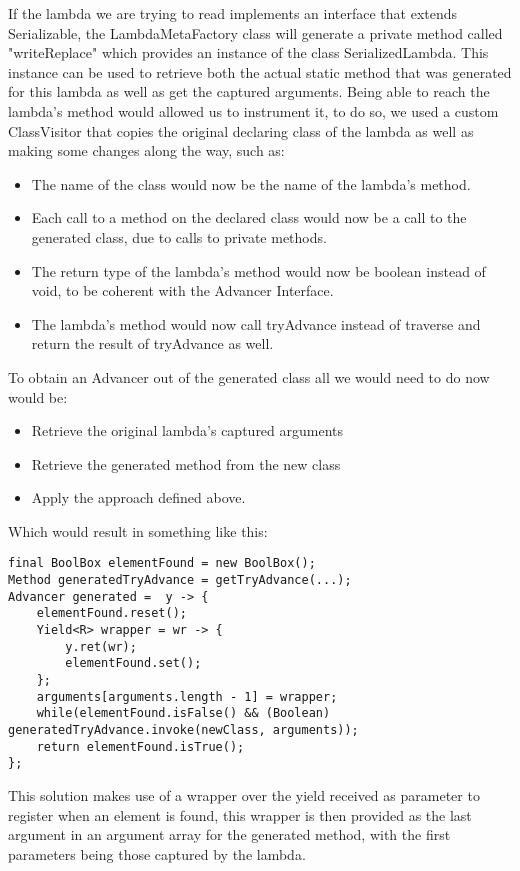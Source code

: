 If the lambda we are trying to read implements an interface that extends Serializable, the LambdaMetaFactory class will generate a private method called 
"writeReplace" which provides an instance of the class SerializedLambda. This instance can be used to retrieve both the actual static method that was generated for this lambda as well as get the captured arguments. Being able to reach the lambda's method would allowed us to instrument it, to do so, we used a custom ClassVisitor that copies the original declaring class of the lambda as well as making some changes along the way, such as:
\begin{itemize}
\item The name of the class would now be the name of the lambda's method.
\item Each call to a method on the declared class would now be a call to the generated class, due to calls to private methods.
\item The return type of the lambda's method would now be boolean instead of void, to be coherent with the Advancer Interface.
\item The lambda's method would now call tryAdvance instead of traverse and return the result of tryAdvance as well.
\end{itemize}

To obtain an Advancer out of the generated class all we would need to do now would be:
\begin{itemize}
\item Retrieve the original lambda's captured arguments
\item Retrieve the generated method from the new class
\item Apply the approach defined above.
\end{itemize}

Which would result in something like this:
\begin{lstlisting}[caption={Generated Advancer},captionpos=b]
final BoolBox elementFound = new BoolBox();
Method generatedTryAdvance = getTryAdvance(...);
Advancer generated =  y -> {
	elementFound.reset();
	Yield<R> wrapper = wr -> {
		y.ret(wr);
		elementFound.set();
	};
	arguments[arguments.length - 1] = wrapper;
	while(elementFound.isFalse() && (Boolean) generatedTryAdvance.invoke(newClass, arguments));
	return elementFound.isTrue();
};
\end{lstlisting}

This solution makes use of a wrapper over the yield received as parameter to register when an element is found, this wrapper is then provided as the last argument in an argument array for the generated method, with the first parameters being those captured by the lambda. 

